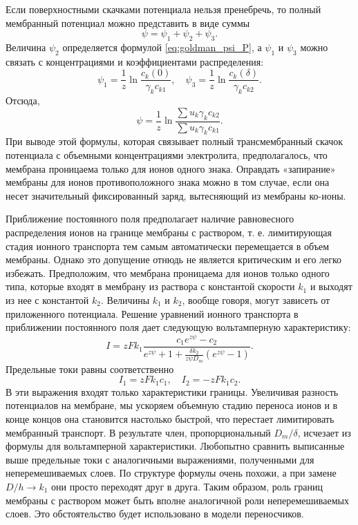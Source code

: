 Если поверхностными скачками потенциала нельзя пренебречь, то полный мембранный
потенциал можно представить в виде суммы
\[
    \psi = \psi_1 + \psi_2 + \psi_3.
\]
Величина \( \psi_2 \) определяется формулой \eqref{eq:goldman_psi_P}, а \( \psi_1 \) и
\( \psi_3 \) можно связать с концентрациями и коэффициентами распределения:
\[
    \psi_1 = \frac{1}{z}\ln\frac{c_k(0)}{\gamma_k c_{k1}},\quad
    \psi_3 = \frac{1}{z}\ln\frac{c_k(\delta)}{\gamma_k c_{k2}}.
\]
Отсюда,
\[
    \psi =\frac{1}{z}
        \ln\frac{\sum u_k \gamma_k c_{k2}}{\sum u_k \gamma_k c_{k1}}.
\]
При выводе этой формулы, которая связывает полный трансмембранный скачок
потенциала с объемными концентрациями электролита, предполагалось, что мембрана
проницаема только для ионов одного знака. Оправдать «запирание» мембраны для
ионов противоположного знака можно в том случае, если она несет значительный
фиксированный заряд, вытесняющий из мембраны ко-ионы.

Приближение постоянного поля предполагает наличие равновесного распределения ионов
на границе мембраны с раствором, т. е. лимитирующая стадия ионного транспорта тем
самым автоматически перемещается в объем мембраны. Однако это допущение отнюдь
не является критическим и его легко избежать. Предположим, что мембрана
проницаема для ионов только одного типа, которые входят в мембрану из раствора
с константой скорости \(k_1\) и выходят из нее с константой \(k_2\). Величины
\(k_1\) и \(k_2\), вообще говоря, могут зависеть от приложенного потенциала.
Решение уравнений ионного транспорта в приближении постоянного поля
дает следующую вольтамперную характеристику:
\begin{equation}
    I = zFk_1\frac{c_1e^{z\psi}-c_2}
        {e^{z\psi}+1+\frac{\delta k_2}{z\psi D_m}(e^{z\psi}-1)}.
    \label{eq:120}
\end{equation}
Предельные токи равны соответственно
\[
    I_1 = zFk_1c_1, \quad I_2 = -zFk_1c_2.
\]
В эти выражения входят только характеристики границы. Увеличивая разность
потенциалов на мембране, мы ускоряем объемную стадию переноса ионов и в конце
концов она становится настолько быстрой, что перестает лимитировать мембранный
транспорт. В результате член, пропорциональный \( D_m / \delta \), исчезает из
формулы для вольтамперной характеристики. Любопытно сравнить выписанные выше
предельные токи с аналогичными выражениями, полученными для
неперемешиваемых слоев. По структуре формулы очень похожи, а при замене
\( D/h \to k_1 \) они просто переходят друг в друга. Таким образом, роль границ
мембраны с раствором может быть вполне аналогичной роли неперемешиваемых слоев.
Это обстоятельство будет использовано в модели переносчиков.

